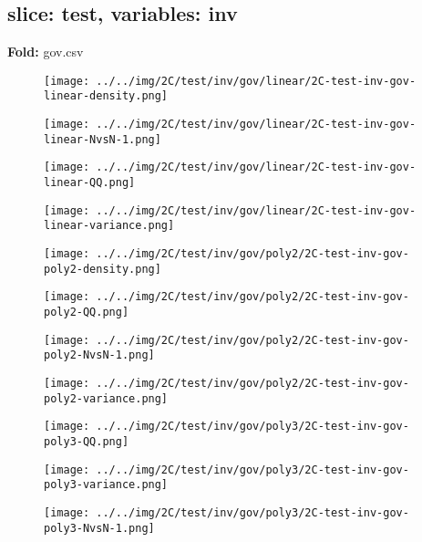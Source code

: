 \subsection{slice: test, variables: inv}
\textbf{Fold:} gov.csv
\begin{figure}[H]
\centering	\texttt{[image: ../../img/2C/test/inv/gov/linear/2C-test-inv-gov-linear-density.png]}
\end{figure}
\begin{figure}[H]
\centering	\texttt{[image: ../../img/2C/test/inv/gov/linear/2C-test-inv-gov-linear-NvsN-1.png]}
\end{figure}
\begin{figure}[H]
\centering	\texttt{[image: ../../img/2C/test/inv/gov/linear/2C-test-inv-gov-linear-QQ.png]}
\end{figure}
\begin{figure}[H]
\centering	\texttt{[image: ../../img/2C/test/inv/gov/linear/2C-test-inv-gov-linear-variance.png]}
\end{figure}
\begin{figure}[H]
\centering	\texttt{[image: ../../img/2C/test/inv/gov/poly2/2C-test-inv-gov-poly2-density.png]}
\end{figure}
\begin{figure}[H]
\centering	\texttt{[image: ../../img/2C/test/inv/gov/poly2/2C-test-inv-gov-poly2-QQ.png]}
\end{figure}
\begin{figure}[H]
\centering	\texttt{[image: ../../img/2C/test/inv/gov/poly2/2C-test-inv-gov-poly2-NvsN-1.png]}
\end{figure}
\begin{figure}[H]
\centering	\texttt{[image: ../../img/2C/test/inv/gov/poly2/2C-test-inv-gov-poly2-variance.png]}
\end{figure}
\begin{figure}[H]
\centering	\texttt{[image: ../../img/2C/test/inv/gov/poly3/2C-test-inv-gov-poly3-QQ.png]}
\end{figure}
\begin{figure}[H]
\centering	\texttt{[image: ../../img/2C/test/inv/gov/poly3/2C-test-inv-gov-poly3-variance.png]}
\end{figure}
\begin{figure}[H]
\centering	\texttt{[image: ../../img/2C/test/inv/gov/poly3/2C-test-inv-gov-poly3-NvsN-1.png]}
\end{figure}
